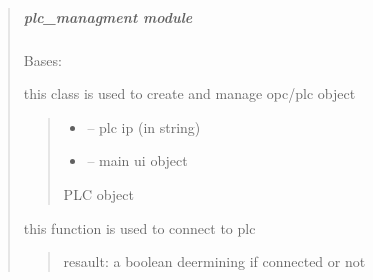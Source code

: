 \documentclass[letterpaper,10pt,english]{sphinxmanual}
\begin{document}
\begin{quote}
\sphinxstepscope


\subparagraph{plc\_managment module}
\label{\detokenize{setting/backend/plc_managment:module-oxin.backend.plc_managment}}\label{\detokenize{setting/backend/plc_managment:plc-managment-module}}\label{\detokenize{setting/backend/plc_managment::doc}}

\begin{savenotes}\begin{fulllineitems}
\label{\detokenize{setting/backend/plc_managment:oxin.backend.plc_managment.management}}
\pysigstartsignatures
{}
\pysigstopsignatures
\sphinxAtStartPar
Bases: 

\sphinxAtStartPar
this class is used to create and manage opc/plc object
\begin{quote}\begin{description}
\begin{itemize}
\item {} 
\sphinxAtStartPar
{} – plc ip (in string)

\item {} 
\sphinxAtStartPar
{} – main ui object

\end{itemize}

\sphinxAtStartPar
PLC object

\end{description}\end{quote}

\begin{savenotes}\begin{fulllineitems}
\label{\detokenize{setting/backend/plc_managment:oxin.backend.plc_managment.management.connection}}
\pysigstartsignatures
{}
\pysigstopsignatures
\sphinxAtStartPar
this function is used to connect to plc
\begin{quote}\begin{description}
\sphinxAtStartPar
resault: a boolean deermining if connected or not


\end{description}
\end{quote}
\end{fulllineitems}
\end{savenotes}
\end{fulllineitems}
\end{savenotes}
\end{quote}
\end{document}
